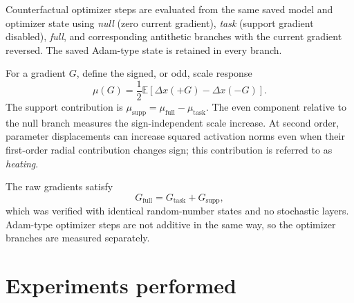 \documentclass[11pt,a4paper]{article}
\begin{document}
Counterfactual optimizer steps are evaluated from the same saved model and optimizer state using \emph{null} (zero current gradient), \emph{task} (support gradient disabled), \emph{full}, and corresponding antithetic branches with the current gradient reversed. The saved Adam-type state is retained in every branch.

For a gradient \(G\), define the signed, or odd, scale response
\[
\mu(G)=\frac12\mathbb E[\Delta x(+G)-\Delta x(-G)].
\]
The support contribution is \(\mu_{\mathrm{supp}}=\mu_{\mathrm{full}}-\mu_{\mathrm{task}}\). The even component relative to the null branch measures the sign-independent scale increase. At second order, parameter displacements can increase squared activation norms even when their first-order radial contribution changes sign; this contribution is referred to as \emph{heating}.

The raw gradients satisfy
\[
G_{\mathrm{full}}=G_{\mathrm{task}}+G_{\mathrm{supp}},
\]
which was verified with identical random-number states and no stochastic layers. Adam-type optimizer steps are not additive in the same way, so the optimizer branches are measured separately.

\section{Experiments performed}
\end{document}

